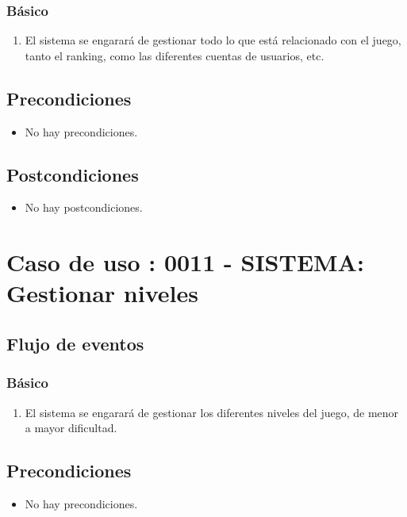 \subsubsection{Básico}

\begin{enumerate}
\item El sistema se engarará de gestionar todo lo que está relacionado con el juego, tanto el ranking, como las diferentes cuentas de usuarios, etc.
\end{enumerate}

\subsection{Precondiciones}
\begin{itemize}
\item No hay precondiciones.
\end{itemize}
\subsection{Postcondiciones}
\begin{itemize}
\item No hay postcondiciones.
\end{itemize}



\section{Caso de uso : 0011 - SISTEMA: Gestionar niveles}\label{sec:uc0}

\subsection{Flujo de eventos}

\subsubsection{Básico}

\begin{enumerate}
\item El sistema se engarará de gestionar los diferentes niveles del juego, de menor a mayor dificultad.
\end{enumerate}

\subsection{Precondiciones}
\begin{itemize}
\item No hay precondiciones.
\end{itemize}

